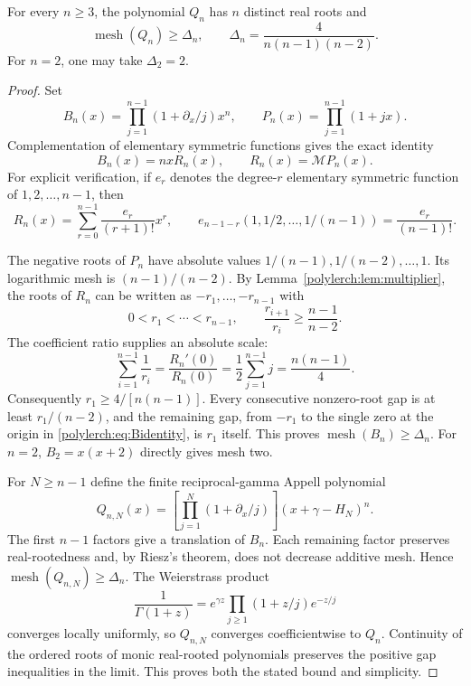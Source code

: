 \begin{theorem}\label{polylerch:thm:mesh}
For every $n\ge3$, the polynomial $Q_n$ has $n$ distinct real roots and
\begin{equation}\label{polylerch:eq:delta}
 \operatorname{mesh}(Q_n)\ge\Delta_n,
 \qquad \Delta_n=\frac4{n(n-1)(n-2)}.
\end{equation}
For $n=2$, one may take $\Delta_2=2$.
\end{theorem}
\begin{proof}
Set
\[
 B_n(x)=\prod_{j=1}^{n-1}(1+\partial_x/j)x^n,
 \qquad P_n(x)=\prod_{j=1}^{n-1}(1+jx).
\]
Complementation of elementary symmetric functions gives the exact
identity
\begin{equation}\label{polylerch:eq:Bidentity}
 B_n(x)=n x R_n(x),\qquad R_n(x)=\mathcal MP_n(x).
\end{equation}
For explicit verification, if $e_r$ denotes the degree-$r$ elementary
symmetric function of $1,2,\ldots,n-1$, then
\[
 R_n(x)=\sum_{r=0}^{n-1}\frac{e_r}{(r+1)!}x^r,
 \qquad
 e_{n-1-r}(1,1/2,\ldots,1/(n-1))=\frac{e_r}{(n-1)!}.
\]

The negative roots of $P_n$ have absolute values
$1/(n-1),1/(n-2),\ldots,1$. Its logarithmic mesh is
$(n-1)/(n-2)$. By Lemma~\ref{polylerch:lem:multiplier}, the roots of
$R_n$ can be written as $-r_1,\ldots,-r_{n-1}$ with
\[
 0<r_1<\cdots<r_{n-1},\qquad
 \frac{r_{i+1}}{r_i}\ge\frac{n-1}{n-2}.
\]
The coefficient ratio supplies an absolute scale:
\[
 \sum_{i=1}^{n-1}\frac1{r_i}
 =\frac{R_n'(0)}{R_n(0)}
 =\frac12\sum_{j=1}^{n-1}j=\frac{n(n-1)}4.
\]
Consequently $r_1\ge4/[n(n-1)]$. Every consecutive nonzero-root
gap is at least $r_1/(n-2)$, and the remaining gap, from $-r_1$ to
the single zero at the origin in \eqref{polylerch:eq:Bidentity}, is
$r_1$ itself. This proves $\operatorname{mesh}(B_n)\ge\Delta_n$.
For $n=2$, $B_2=x(x+2)$ directly gives mesh two.

For $N\ge n-1$ define the finite reciprocal-gamma Appell polynomial
\[
 Q_{n,N}(x)=\left[\prod_{j=1}^{N}(1+\partial_x/j)\right]
                  (x+\gamma-H_N)^n.
\]
The first $n-1$ factors give a translation of $B_n$. Each remaining
factor preserves real-rootedness and, by Riesz's theorem, does not
decrease additive mesh. Hence $\operatorname{mesh}(Q_{n,N})\ge\Delta_n$.
The Weierstrass product
\[
 \frac1{\Gamma(1+z)}=e^{\gamma z}
             \prod_{j\ge1}(1+z/j)e^{-z/j}
\]
converges locally uniformly, so $Q_{n,N}$ converges coefficientwise
to $Q_n$. Continuity of the ordered roots of monic real-rooted
polynomials preserves the positive gap inequalities in the limit.
This proves both the stated bound and simplicity.
\end{proof}

